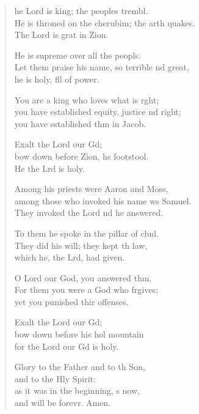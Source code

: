 \settowidth{\versewidth}{He is throned on the cherubim; the earth quakes. *}
\begin{verse}%
  \begin{patverse}
he Lord is king; the peoples trembl.\Flex\\
He is throned on the cherubim; the arth quakes.\Med\\
The Lord is grat in Zion.

He is supreme over all the peopls.\Flex\\
Let them praise his name, so terrible nd great,\Med\\
he is holy, fll of power.

You are a king who loves what is r\pointup{\i}ght;\Flex\\
you have established equity, justice nd right;\Med\\
you have established thm in Jacob.

Exalt the Lord our Gd;\Flex\\
bow down before Zion, h\pointup{\i}s footstool.\Med\\
He the Lrd is holy.

Among his priests were Aaron and Moss,\Flex\\
among those who invoked his name ws Samuel.\Med\\
They invoked the Lord nd he answered.

To them he spoke in the pillar of clud.\Flex\\
They did his will; they kept th law,\Med\\
which he, the Lrd, had given.

O Lord our God, you answered thm.\Flex\\
For them you were a God who frgives;\Med\\
yet you punished thir offenses.

Exalt the Lord our Gd;\Flex\\
bow down before his hol mountain\Med\\
for the Lord our Gd is holy.

Glory to the Father and to th Son,\Med\\
and to the Hly Spirit:\\
as it was in the beginning, \pointup{\i}s now,\Med\\
and will be forevr. Amen.
  \end{patverse}
\end{verse}
